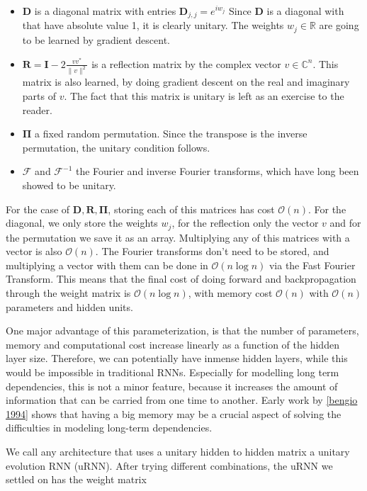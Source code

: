 \documentclass{article} %
\newcommand{\matr}[1]{\mathbf{#1}}
\newcommand\RR{\mathbb{R}}
\begin{document}
\begin{itemize}
  \item $\matr{D}$ is a diagonal matrix with entries $\matr{D}_{j,j} = e^{i w_j}$ Since $\matr{D}$ is a diagonal with that have absolute value 1, it is clearly unitary. The weights $w_j \in \RR$ are going to be learned by gradient descent.
  \item $\matr{R} = \matr{I} - 2 \frac{v v^*}{\|v\|^2}$ is a reflection matrix by the complex vector $v \in \mathbb{C}^n$. This matrix is also learned, by doing gradient descent on the real and imaginary parts of $v$. The fact that this matrix is unitary is left as an exercise to the reader.
  \item $\matr{\Pi}$ a fixed random permutation. Since the transpose is the inverse permutation, the unitary condition follows.
  \item $\mathcal{F}$ and $\mathcal{F}^{-1}$ the Fourier and inverse Fourier transforms, which have long been showed to be unitary.
\end{itemize}

For the case of $\matr{D}, \matr{R}, \matr{\Pi}$, storing each of this matrices has cost $\mathcal{O}(n)$. For the diagonal, we only store the weights $w_j$, for the reflection only the vector $v$ and for the permutation we save it as an array. Multiplying any of this matrices with a vector is also $\mathcal{O}(n)$. The Fourier transforms don't need to be stored, and multiplying a vector with them can be done in $\mathcal{O}(n \log n)$ via the Fast Fourier Transform. This means that the final cost of doing forward and backpropagation through the weight matrix is $\mathcal{O} (n \log n)$, with memory cost $\mathcal{O} (n)$ with $\mathcal{O}(n)$ parameters and hidden units.

One major advantage of this parameterization, is that the number of parameters, memory and computational cost increase linearly as a function of the hidden layer size. Therefore, we can potentially have inmense hidden layers, while this would be impossible in traditional RNNs. Especially for modelling long term dependencies, this is not a minor feature, because it increases the amount of information that can be carried from one time to another. Early work by \ref{bengio 1994} shows that having a big memory may be a crucial aspect of solving the difficulties in modeling long-term dependencies.

We call any architecture that uses a unitary hidden to hidden matrix a unitary evolution RNN (uRNN). After trying different combinations, the uRNN we settled on has the weight matrix
\end{document}
